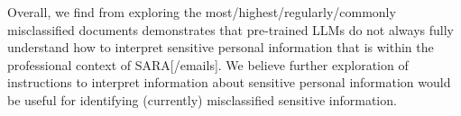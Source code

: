 Overall, we find from exploring the most/highest/regularly/commonly misclassified documents demonstrates that pre-trained LLMs do not always fully understand how to interpret sensitive personal information that is within the professional context of SARA[/emails]. We believe further exploration of instructions to interpret information about sensitive personal information would be useful for identifying (currently) misclassified sensitive information. 
